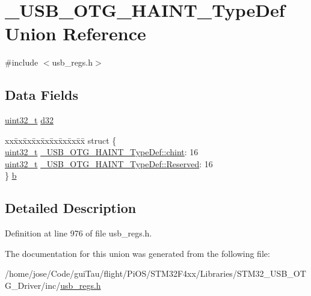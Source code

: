 \hypertarget{union___u_s_b___o_t_g___h_a_i_n_t___type_def}{\section{\-\_\-\-U\-S\-B\-\_\-\-O\-T\-G\-\_\-\-H\-A\-I\-N\-T\-\_\-\-Type\-Def Union Reference}
\label{union___u_s_b___o_t_g___h_a_i_n_t___type_def}
}


{\ttfamily \#include $<$usb\-\_\-regs.\-h$>$}

\subsection*{Data Fields}
\begin{DoxyCompactItemize}
\item 
\hyperlink{stdint_8h_a435d1572bf3f880d55459d9805097f62}{uint32\-\_\-t} \hyperlink{group___u_s_b___o_t_g___d_r_i_v_e_r_gaf31801d9033db4be2c72b0ca2f2f017b}{d32}
\item 
\begin{tabbing}
xx\=xx\=xx\=xx\=xx\=xx\=xx\=xx\=xx\=\kill
struct \{\\
\>\hyperlink{stdint_8h_a435d1572bf3f880d55459d9805097f62}{uint32\_t} \hyperlink{group___u_s_b___o_t_g___d_r_i_v_e_r_gaa5b226912e64d070153feb7a20f3ffa5}{\_USB\_OTG\_HAINT\_TypeDef::chint}: 16\\
\>\hyperlink{stdint_8h_a435d1572bf3f880d55459d9805097f62}{uint32\_t} \hyperlink{group___u_s_b___o_t_g___d_r_i_v_e_r_ga9c409040b625226f65c1c50cf02772fb}{\_USB\_OTG\_HAINT\_TypeDef::Reserved}: 16\\
\} \hyperlink{group___u_s_b___o_t_g___d_r_i_v_e_r_ga8e2e7c8a17595d15fc874ba69dbf690d}{b}\\

\end{tabbing}\end{DoxyCompactItemize}


\subsection{Detailed Description}


Definition at line 976 of file usb\-\_\-regs.\-h.



The documentation for this union was generated from the following file\-:\begin{DoxyCompactItemize}
\item 
/home/jose/\-Code/gui\-Tau/flight/\-Pi\-O\-S/\-S\-T\-M32\-F4xx/\-Libraries/\-S\-T\-M32\-\_\-\-U\-S\-B\-\_\-\-O\-T\-G\-\_\-\-Driver/inc/\hyperlink{_s_t_m32_f4xx_2_libraries_2_s_t_m32___u_s_b___o_t_g___driver_2inc_2usb__regs_8h}{usb\-\_\-regs.\-h}\end{DoxyCompactItemize}
